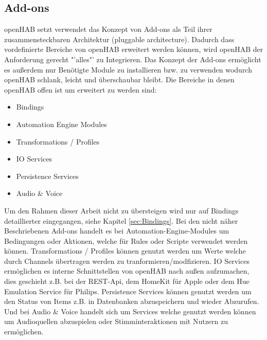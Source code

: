 \subsection{Add-ons}\label{sec:add-ons}
openHAB setzt verwendet das Konzept von Add-ons als Teil ihrer zusammensteckbaren Architektur (pluggable architecture). Dadurch dass vordefinierte Bereiche von openHAB erweitert werden können, wird openHAB der Anforderung gerecht "'alles"' zu Integrieren. Das Konzept der Add-ons ermöglicht es außerdem nur Benötigte Module zu installieren bzw. zu verwenden wodurch openHAB schlank, leicht und überschaubar bleibt. Die Bereiche in denen openHAB offen ist um erweitert zu werden sind:
\begin{itemize}
	\item Bindings
	\item Automation Engine Modules
	\item Transformations / Profiles
	\item IO Services
	\item Persistence Services
	\item Audio \& Voice
\end{itemize}
Um den Rahmen dieser Arbeit nicht zu übersteigen wird nur auf Bindings detaillierter eingegangen, siehe Kapitel \ref{sec:Bindings}. Bei den nicht näher Beschriebenen Add-ons handelt es bei Automation-Engine-Modules um Bedingungen oder Aktionen, welche für Rules oder Scripte verwendet werden können. Transformations / Profiles können genutzt werden um Werte welche durch Channels übertragen werden zu tranformieren/modfizieren. IO Services ermöglichen es interne Schnittstellen von openHAB nach außen aufzumachen, dies geschieht z.B. bei der REST-Api, dem HomeKit für Apple oder dem Hue Emulation Service für Philips. Persistence Services können genutzt werden um den Status von Items z.B. in Datenbanken abzuspeichern und wieder Abzurufen. Und bei Audio \& Voice handelt sich um Services welche genutzt werden können um Audioquellen abzuspielen oder Stimminteraktionen mit Nutzern zu ermöglichen. 

